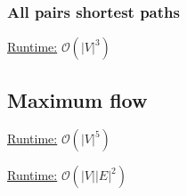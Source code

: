 \subsubsection{All pairs shortest paths}
\underline{Runtime:} $\mathcal{O}(\lvert V \rvert^3)$


\subsection{Maximum flow}

\underline{Runtime:} $\mathcal{O}(\lvert V \rvert^5)$


\underline{Runtime:} $\mathcal{O}(\lvert V \rvert \lvert E \rvert^2)$



